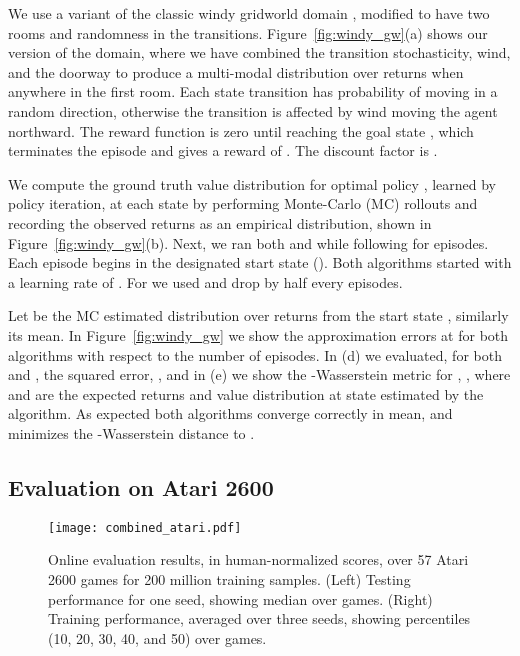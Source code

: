 \documentclass[letterpaper]{article}
\begin{document}
We use a variant of the classic windy gridworld domain \cite{sutton98reinforcement}, modified to have two rooms and randomness in the transitions. Figure~\ref{fig:windy_gw}(a) shows our version of the domain, where we have combined the transition stochasticity, wind, and the doorway to produce a multi-modal distribution over returns when anywhere in the first room. Each state transition has probability  of moving in a random direction, otherwise the transition is affected by wind moving the agent northward. The reward function is zero until reaching the goal state , which terminates the episode and gives a reward of . The discount factor is .

We compute the ground truth value distribution for optimal policy , learned by policy iteration, at each state by performing  Monte-Carlo (MC) rollouts and recording the observed returns as an empirical distribution, shown in Figure~\ref{fig:windy_gw}(b). Next, we ran both  and  while following  for  episodes. Each episode begins in the designated start state (). Both algorithms started with a learning rate of . For  we used  and drop  by half every  episodes.

Let  be the MC estimated distribution over returns from the start state , similarly  its mean. In Figure~\ref{fig:windy_gw} we show the approximation errors at  for both algorithms with respect to the number of episodes. In (d) we evaluated, for both  and , the squared error, , and in (e) we show the -Wasserstein metric for , , where  and  are the expected returns and value distribution at state  estimated by the algorithm. As expected both algorithms converge correctly in mean, and  minimizes the -Wasserstein distance to .


\subsection{Evaluation on Atari 2600}

\begin{figure*}[ht]
\begin{center}
\texttt{[image: combined\_atari.pdf]}
\end{center}
\caption{Online evaluation results, in human-normalized scores, over 57 Atari 2600 games for 200 million training samples. (Left) Testing performance for one seed, showing median over games. (Right) Training performance, averaged over three seeds, showing percentiles (10, 20, 30, 40, and 50) over games.\label{fig:wdqn_test}}
\end{figure*}
\end{document}
